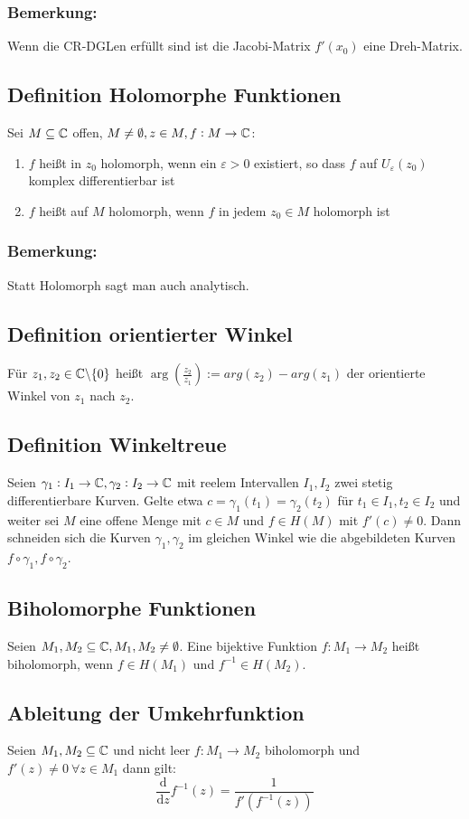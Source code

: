 \subsubsection{Bemerkung:}
Wenn die CR-DGLen erfüllt sind ist die Jacobi-Matrix $f'(x_0)$ eine Dreh-Matrix.

\subsection{Definition Holomorphe Funktionen}
Sei $M \subseteq \mathbb{C}$ offen, $M \neq \emptyset, z \in M, f: M \to \mathbb{C}$:
\begin{enumerate}
    \item $f$ heißt in $z_0$ holomorph, wenn ein $\varepsilon > 0$ existiert, so dass $f$ auf $U_\varepsilon(z_0)$
        komplex differentierbar ist
    \item $f$ heißt auf $M$ holomorph, wenn $f$ in jedem $z_0 \in M$ holomorph ist
\end{enumerate}

\subsubsection{Bemerkung:}
Statt Holomorph sagt man auch analytisch.

\subsection{Definition orientierter Winkel}
Für $z_1, z_2 \in \mathbb{C} \backslash \{0\}$ heißt $\arg(\frac{z_2}{z_1}) := arg(z_2) - arg(z_1)$ der orientierte Winkel
von $z_1$ nach $z_2$.

\subsection{Definition Winkeltreue}
Seien $\gamma_1: I_1 \to \mathbb{C}, \gamma_2: I_2 \to \mathbb{C}$ mit reelem Intervallen $I_1, I_2$ zwei stetig differentierbare
Kurven. Gelte etwa $c = \gamma_1(t_1) = \gamma_2(t_2)$ für $t_1 \in I_1, t_2 \in I_2$ und weiter sei $M$ eine
offene Menge mit $c \in M$ und $f \in H(M)$ mit $f'(c) \neq 0$. Dann schneiden sich die Kurven $\gamma_1, \gamma_2$
im gleichen Winkel wie die abgebildeten Kurven $f \circ \gamma_1, f \circ \gamma_2$.

\subsection{Biholomorphe Funktionen}
Seien $M_1, M_2 \subseteq \mathbb{C}, M_1, M_2 \neq \emptyset$. Eine bijektive Funktion $f: M_1 \to M_2$ heißt biholomorph,
wenn $f \in H(M_1)$ und $f^{-1} \in H(M_2)$.

\subsection{Ableitung der Umkehrfunktion}
Seien $M_1, M_2 \subseteq \mathbb{C}$ und nicht leer $f: M_1 \to M_2$ biholomorph und $f'(z) \neq 0\ \forall z \in M_1$ dann
gilt:
\begin{equation*}
    \frac{\text{d}}{\text{d}z} f^{-1}(z) = \frac{1}{f'(f^{-1}(z))}
\end{equation*}

